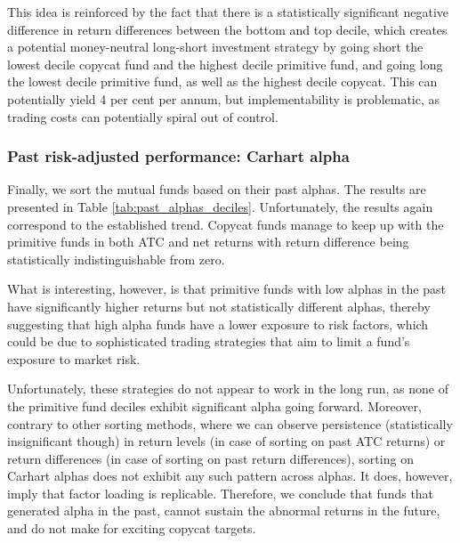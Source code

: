\documentclass[12pt, a4]{article}
\begin{document}
This idea is reinforced by the fact that there is a statistically significant negative difference in return differences between the bottom and top decile, which creates a potential money-neutral long-short investment strategy by going short the lowest decile copycat fund and the highest decile primitive fund, and going long the lowest decile primitive fund, as well as the highest decile copycat. This can potentially yield 4 per cent per annum, but implementability is problematic, as trading costs can potentially spiral out of control.

\subsubsection{Past risk-adjusted performance: Carhart alpha}

Finally, we sort the mutual funds based on their past alphas. The results are presented in Table \ref{tab:past_alphas_deciles}. Unfortunately, the results again correspond to the established trend. Copycat funds manage to keep up with the primitive funds in both \textsc{ATC} and net returns with return difference being statistically indistinguishable from zero.

What is interesting, however, is that primitive funds with low alphas in the past have significantly higher returns but not statistically different alphas, thereby suggesting that high alpha funds have a lower exposure to risk factors, which could be due to sophisticated trading strategies that aim to limit a fund's exposure to market risk.

Unfortunately, these strategies do not appear to work in the long run, as none of the primitive fund deciles exhibit significant alpha going forward. Moreover, contrary to other sorting methods, where we can observe persistence (statistically insignificant though) in return levels (in case of sorting on past \textsc{ATC} returns) or return differences (in case of sorting on past return differences), sorting on Carhart alphas does not exhibit any such pattern across alphas. It does, however, imply that factor loading is replicable. Therefore, we conclude that funds that generated alpha in the past, cannot sustain the abnormal returns in the future, and do not make for exciting copycat targets.
\end{document}
